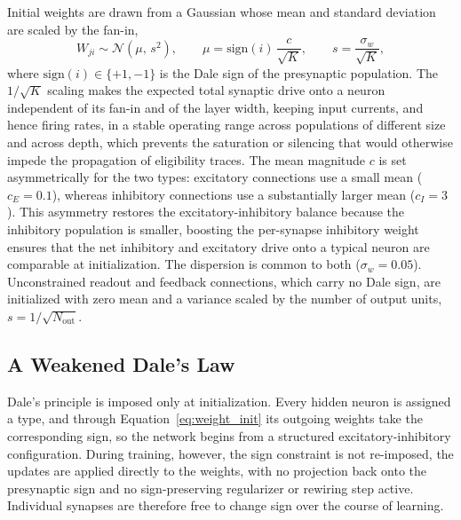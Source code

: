 Initial weights are drawn from a Gaussian whose mean and standard deviation
are scaled by the fan-in,
%
\begin{equation}
W_{ji} \sim \mathcal{N}\!\left( \mu, \, s^2 \right),
\qquad
\mu = \mathrm{sign}(i)\,\frac{c}{\sqrt{K}},
\qquad
s = \frac{\sigma_w}{\sqrt{K}},
\label{eq:weight_init}
\end{equation}
%
where $\mathrm{sign}(i) \in \{+1, -1\}$ is the Dale sign of the presynaptic
population. The $1/\sqrt{K}$ scaling makes the expected total synaptic drive
onto a neuron independent of its fan-in and of the layer width, keeping input
currents, and hence firing rates, in a stable operating range across
populations of different size and across depth, which prevents the saturation
or silencing that would otherwise impede the propagation of eligibility
traces. The mean magnitude $c$ is set asymmetrically for the two types:
excitatory connections use a small mean ($c_E = 0.1$), whereas inhibitory
connections use a substantially larger mean ($c_I = 3$). This asymmetry
restores the excitatory-inhibitory balance because the inhibitory population
is smaller, boosting the per-synapse inhibitory weight
ensures that the net inhibitory and excitatory drive onto a typical neuron are
comparable at initialization. The dispersion is common to both
($\sigma_w = 0.05$). Unconstrained readout and feedback connections, which
carry no Dale sign, are initialized with zero mean and a variance scaled by
the number of output units, $s = 1/\sqrt{N_{\text{out}}}$.

\subsection{A Weakened Dale's Law}
\label{sec:weakened_dale}

Dale's principle is imposed only at initialization. Every hidden neuron is assigned a
type, and through Equation~\ref{eq:weight_init} its outgoing weights take the
corresponding sign, so the network begins from a structured excitatory-inhibitory
configuration. During training, however, the sign constraint is not re-imposed, the updates are applied directly to the weights, with no projection back onto the
presynaptic sign and no sign-preserving regularizer or rewiring step active. Individual
synapses are therefore free to change sign over the course of learning.

